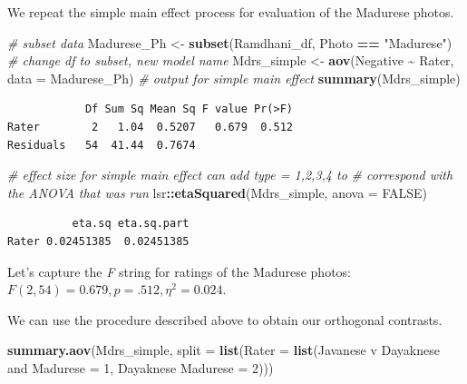 \documentclass[
  11pt,
]{book}
\newenvironment{Shaded}{\begin{snugshade}}{\end{snugshade}}
\newcommand{\AttributeTok}[1]{\textcolor[rgb]{0.27,0.27,0.27}{#1}}
\newcommand{\CommentTok}[1]{\textcolor[rgb]{0.37,0.37,0.37}{\textit{#1}}}
\newcommand{\ConstantTok}[1]{\textcolor[rgb]{0.37,0.37,0.37}{#1}}
\newcommand{\DecValTok}[1]{\textcolor[rgb]{0.06,0.06,0.06}{#1}}
\newcommand{\FunctionTok}[1]{\textcolor[rgb]{0.27,0.27,0.27}{\textbf{#1}}}
\newcommand{\NormalTok}[1]{#1}
\newcommand{\OtherTok}[1]{\textcolor[rgb]{0.37,0.37,0.37}{#1}}
\newcommand{\SpecialCharTok}[1]{\textcolor[rgb]{0.43,0.43,0.43}{\textbf{#1}}}
\newcommand{\StringTok}[1]{\textcolor[rgb]{0.5,0.5,0.5}{#1}}
\begin{document}
We repeat the simple main effect process for evaluation of the Madurese photos.

\begin{Shaded}
\begin{Highlighting}[]
\CommentTok{\# subset data}
\NormalTok{Madurese\_Ph }\OtherTok{\textless{}{-}} \FunctionTok{subset}\NormalTok{(Ramdhani\_df, Photo }\SpecialCharTok{==} \StringTok{"Madurese"}\NormalTok{)}
\CommentTok{\# change df to subset, new model name}
\NormalTok{Mdrs\_simple }\OtherTok{\textless{}{-}} \FunctionTok{aov}\NormalTok{(Negative }\SpecialCharTok{\textasciitilde{}}\NormalTok{ Rater, }\AttributeTok{data =}\NormalTok{ Madurese\_Ph)}
\CommentTok{\# output for simple main effect}
\FunctionTok{summary}\NormalTok{(Mdrs\_simple)}
\end{Highlighting}
\end{Shaded}

\begin{verbatim}
            Df Sum Sq Mean Sq F value Pr(>F)
Rater        2   1.04  0.5207   0.679  0.512
Residuals   54  41.44  0.7674               
\end{verbatim}

\begin{Shaded}
\begin{Highlighting}[]
\CommentTok{\# effect size for simple main effect can add \textquotesingle{}type = 1,2,3,4\textquotesingle{} to}
\CommentTok{\# correspond with the ANOVA that was run}
\NormalTok{lsr}\SpecialCharTok{::}\FunctionTok{etaSquared}\NormalTok{(Mdrs\_simple, }\AttributeTok{anova =} \ConstantTok{FALSE}\NormalTok{)}
\end{Highlighting}
\end{Shaded}

\begin{verbatim}
          eta.sq eta.sq.part
Rater 0.02451385  0.02451385
\end{verbatim}

Let's capture the \emph{F} string for ratings of the Madurese photos: \(F(2, 54) = 0.679, p = .512, \eta ^{2} = 0.024\).

We can use the procedure described above to obtain our orthogonal contrasts.

\begin{Shaded}
\begin{Highlighting}[]
\FunctionTok{summary.aov}\NormalTok{(Mdrs\_simple, }\AttributeTok{split =} \FunctionTok{list}\NormalTok{(}\AttributeTok{Rater =} \FunctionTok{list}\NormalTok{(}\StringTok{\textasciigrave{}}\AttributeTok{Javanese v Dayaknese and Madurese}\StringTok{\textasciigrave{}} \OtherTok{=} \DecValTok{1}\NormalTok{,}
    \StringTok{\textasciigrave{}}\AttributeTok{Dayaknese Madurese}\StringTok{\textasciigrave{}} \OtherTok{=} \DecValTok{2}\NormalTok{)))}
\end{Highlighting}
\end{Shaded}
\end{document}
